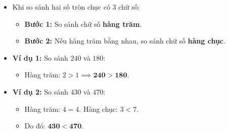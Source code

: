 \documentclass[10pt,a4paper]{article}
\begin{document}
\begin{minipage}[t]{0.49\textwidth}\vspace{0pt}
\begin{tcolorbox}[
  enhanced,
  colback=teal!4!white,
  colframe=teal!75!black,
  arc=2mm, boxrule=0.8pt,
  left=2mm, right=2mm, top=1.8mm, bottom=1.8mm,
  title={\footnotesize\bfseries\color{white}\faSliders\ 2. So sánh các số tròn chục}
]
{\footnotesize
\begin{itemize}\setlength{\itemsep}{1pt}\setlength{\leftskip}{-2.5mm}
  \item Khi so sánh hai số tròn chục có 3 chữ số:
  \begin{itemize}\setlength{\itemsep}{0.5pt}\setlength{\leftskip}{-2mm}
    \item \textbf{Bước 1:} So sánh chữ số \textbf{hàng trăm}.
    \item \textbf{Bước 2:} Nếu hàng trăm bằng nhau, so sánh chữ số \textbf{hàng chục}.
  \end{itemize}
  \item \textbf{Ví dụ 1:} So sánh $240$ và $180$:
  \begin{itemize}\setlength{\itemsep}{0.5pt}\setlength{\leftskip}{-2mm}
    \item Hàng trăm: $2 > 1 \implies \mathbf{240 > 180}$.
  \end{itemize}
  \item \textbf{Ví dụ 2:} So sánh $430$ và $470$:
  \begin{itemize}\setlength{\itemsep}{0.5pt}\setlength{\leftskip}{-2mm}
    \item Hàng trăm: $4 = 4$. Hàng chục: $3 < 7$.
    \item Do đó: $\mathbf{430 < 470}$.
  \end{itemize}
\end{itemize}
}
\end{tcolorbox}
\end{minipage}
\end{document}
